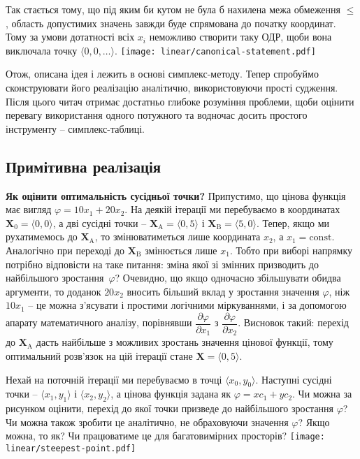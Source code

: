 \documentclass[\main/book.tex]{subfiles}
\begin{document}
\begin{note}
 Так стається тому, що під яким би кутом не була б нахилена межа обмеження \flqq{}$\leq$\frqq{}, область допустимих значень завжди буде спрямована до початку координат. Тому за умови дотатності всіх $x_i$ неможливо створити таку ОДР, щоби вона виключала точку ${\langle 0, 0, \ldots \rangle}$.
 \center
 \texttt{[image: linear/canonical-statement.pdf]}
\end{note}

Отож, описана ідея і лежить в основі симплекс-методу. Тепер спробуймо сконструювати його реалізацію аналітично, використовуючи прості судження. Після цього читач отримає достатньо глибоке розуміння проблеми, щоби оцінити перевагу використання одного потужного та водночас досить простого інструменту -- симплекс-таблиці.

\subsection{Примітивна реалізація}

\textbf{Як оцінити оптимальність сусідньої точки?} \quad Припустимо, що цінова функція має вигляд $\varphi = 10 x_1 + 20 x_2$. На деякій ітерації ми перебуваємо в координатах $\mathbf{X}_0 = \langle 0, 0 \rangle$, а дві сусідні точки -- ${\mathbf{X}_\mathrm{A} = \langle 0, 5 \rangle}$ і ${\mathbf{X}_\mathrm{B} = \langle 5, 0 \rangle}$. Тепер, якщо ми рухатимемось до $\mathbf{X}_\mathrm{A}$, то змінюватиметься лише координата $x_2$, а $x_1=\mathrm{const}$. Аналогічно при переході до $\mathbf{X}_\mathrm{B}$ змінюється лише $x_1$. Тобто при виборі напрямку потрібно відповісти на таке питання: зміна якої зі змінних призводить до найбільшого зростання~$\varphi$? Очевидно, що якщо одночасно збільшувати обидва аргументи, то доданок $20x_2$ вносить більший вклад у зростання значення $\varphi$, ніж $10x_1$ -- це можна з'ясувати і простими логічними міркуваннями, і за допомогою апарату математичного аналізу, порівнявши $\dfrac{\partial \varphi}{\partial x_1}$ з $\dfrac{\partial \varphi}{\partial x_2}$. Висновок такий: перехід до $\mathbf{X}_\mathrm{A}$ дасть найбільше з можливих зростань значення цінової функції, тому оптимальний розв'язок на цій ітерації стане $\mathbf{X} = \langle 0, 5 \rangle$.

\begin{question}
 Нехай на поточній ітерації ми перебуваємо в точці $\langle x_0, y_0 \rangle$. Наступні сусідні точки -- $\langle x_1, y_1 \rangle$ і $\langle x_2, y_2 \rangle$, а цінова функція задана як $\varphi = x c_1 + y c_2$. Чи можна за рисунком оцінити, перехід до якої точки призведе до найбільшого зростання $\varphi$? Чи можна також зробити це аналітично, не обраховуючи значення $\varphi$? Якщо можна, то як? Чи працюватиме це для багатовимірних просторів?
 \center
 \texttt{[image: linear/steepest-point.pdf]}
\end{question}
\end{document}
